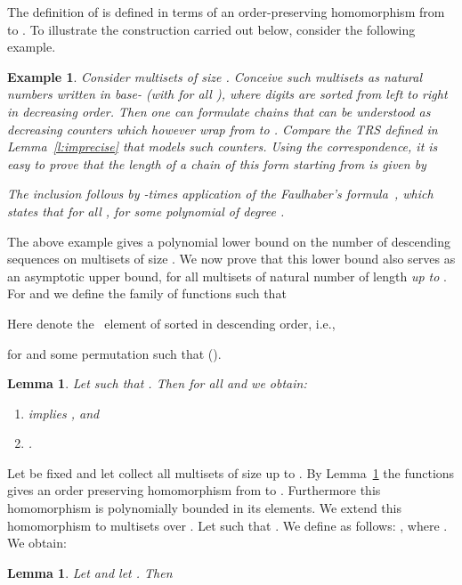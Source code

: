 \documentclass{LMCS}
\newtheorem{example}[thm]{Example}
\newtheorem{lemma}[thm]{Lemma}
\begin{document}
The definition of  is defined in terms of an order-preserving homomorphism from  to . 
To illustrate the construction carried out below, consider the following example.
\begin{example}\label{ex:multisets}
  Consider multisets  of size .
Conceive such multisets  as 
  natural 
  numbers written in base- (with  for all ), 
  where digits  are sorted from left to right in decreasing order.
  Then one can formulate chains  
  that can be understood as decreasing counters 
  which however wrap from
   to . 
  Compare the TRS  defined in Lemma~\ref{l:imprecise} that models such counters.\@
  Using the correspondence, it is
  easy to prove that the length of a chain of this form
  starting from 
  is given by
  
  The inclusion follows by -times application of the 
  Faulhaber's formula~\cite{K93}, which states that 
  for all , 
   for some polynomial  of degree . 
\end{example}

The above example gives a polynomial lower bound on the number of  descending 
sequences on multisets  of size .
We now prove that this lower bound also serves as an asymptotic upper bound, 
for all multisets of natural number of length \emph{up to} . 
For  and  we define the family of functions  
such that 

Here  denote the \nth{}\ element of  sorted in descending order, i.e., 
 
for  and some permutation  such that  ().
\begin{lemma}\label{l:homo}
  Let  such that . Then
  for all  and  we obtain:
  \begin{enumerate}[labelsep=*,leftmargin=*]
\item\label{l:homo:5} 
     implies , and
  \item\label{l:homo:4} 
    .
  \end{enumerate}
\end{lemma}

Let  be fixed and let  collect all multisets of size up to .
By Lemma~\ref{l:homo} the functions  
gives an order preserving homomorphism from  to .
Furthermore this homomorphism is polynomially bounded in its elements.
We extend this homomorphism to multisets  over .
Let  such that .
  We define  as follows:
  ,
  where .
We obtain:
\begin{lemma}\label{l:slowpoly}
  Let  and let . Then
  
\end{lemma}
\end{document}
